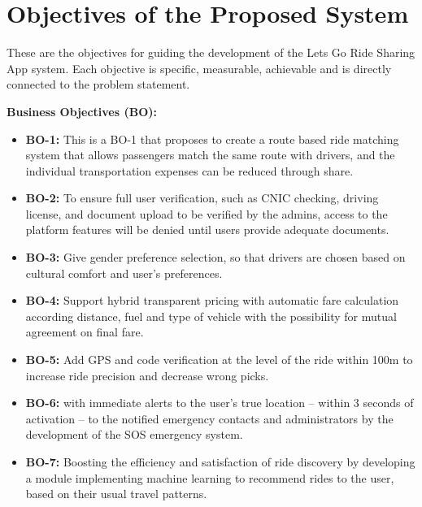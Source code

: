 \section{Objectives of the Proposed System}

These are the objectives for guiding the development of the Lets Go Ride Sharing App system. Each objective is specific, measurable, achievable and is directly connected to the problem statement.

\vspace{0.3cm}

\textbf{Business Objectives (BO):}

\begin{itemize}
    \item \textbf{BO-1:} This is a BO-1 that proposes to create a route based ride matching system that allows passengers match the same route with drivers, and the individual transportation expenses can be reduced through share.

    \item \textbf{BO-2:} To ensure full user verification, such as CNIC checking, driving license, and document upload to be verified by the admins, access to the platform features will be denied until users provide adequate documents.

    \item \textbf{BO-3:} Give gender preference selection, so that drivers are chosen based on cultural comfort and user's preferences.

    \item \textbf{BO-4:} Support hybrid transparent pricing with automatic fare calculation according distance, fuel and type of vehicle with the possibility for mutual agreement on final fare.

    \item \textbf{BO-5:} Add GPS and code verification at the level of the ride within 100m to increase ride precision and decrease wrong picks.

    \item \textbf{BO-6:} with immediate alerts to the user's true location – within 3 seconds of activation – to the notified emergency contacts and administrators by the development of the SOS emergency system.

    \item \textbf{BO-7:} Boosting the efficiency and satisfaction of ride discovery by developing a module implementing machine learning to recommend rides to the user, based on their usual travel patterns.


\end{itemize}
